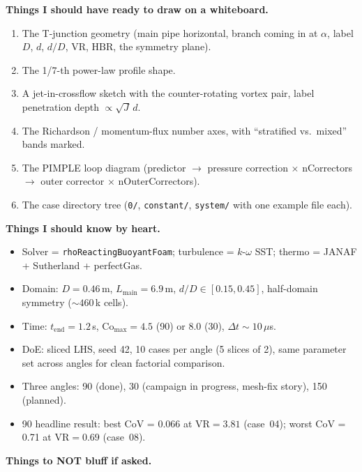 \documentclass[11pt,a4paper]{article}
\newcommand{\dD}{\ensuremath{d/D}}
\newcommand{\VR}{\ensuremath{\mathrm{VR}}}
\newcommand{\HBR}{\ensuremath{\mathrm{HBR}}}
\begin{document}
\textbf{Things I should have ready to draw on a whiteboard.}

\begin{enumerate}[leftmargin=1.5em]
    \item The T-junction geometry (main pipe horizontal, branch coming
    in at $\alpha$, label $D$, $d$, $\dD$, $\VR$, $\HBR$, the symmetry
    plane).
    \item The 1/7-th power-law profile shape.
    \item A jet-in-crossflow sketch with the counter-rotating vortex
    pair, label penetration depth $\propto \sqrt{J}\,d$.
    \item The Richardson / momentum-flux number axes, with
    ``stratified vs.\ mixed'' bands marked.
    \item The PIMPLE loop diagram (predictor $\rightarrow$ pressure
    correction $\times$ nCorrectors $\rightarrow$ outer corrector
    $\times$ nOuterCorrectors).
    \item The case directory tree (\texttt{0/}, \texttt{constant/},
    \texttt{system/} with one example file each).
\end{enumerate}

\textbf{Things I should know by heart.}

\begin{itemize}[leftmargin=1.5em]
    \item Solver = \texttt{rhoReactingBuoyantFoam}; turbulence =
    $k$-$\omega$ SST; thermo = JANAF + Sutherland + perfectGas.
    \item Domain: $D = 0.46$\,m, $L_\mathrm{main} = 6.9$\,m,
    $\dD\in[0.15,0.45]$, half-domain symmetry ($\sim 460$\,k cells).
    \item Time: $t_\mathrm{end} = 1.2$\,s, $\mathrm{Co}_\mathrm{max} = 4.5$
    (90\textdegree{}) or 8.0 (30\textdegree{}), $\Delta t \sim 10$\,$\mu$s.
    \item DoE: sliced LHS, seed 42, 10 cases per angle (5 slices of 2),
    same parameter set across angles for clean factorial comparison.
    \item Three angles: 90\textdegree{} (done), 30\textdegree{}
    (campaign in progress, mesh-fix story), 150\textdegree{} (planned).
    \item 90\textdegree{} headline result: best CoV = 0.066 at
    $\VR=3.81$ (case~04); worst CoV = 0.71 at $\VR=0.69$ (case~08).
\end{itemize}

\textbf{Things to NOT bluff if asked.}
\end{document}
